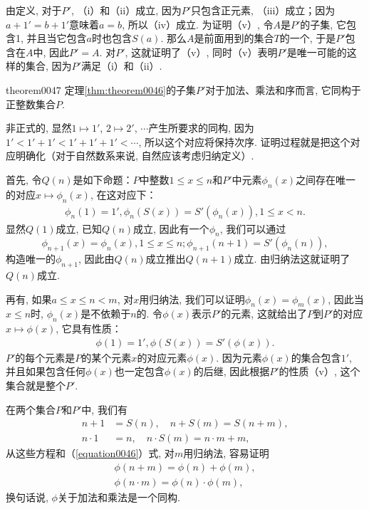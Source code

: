 由定义, 对于$P'$, （i）和（ii）成立, 因为$P'$只包含正元素, （iii）成立；因为$a+1'=b+1'$意味着$a=b$, 所以（iv）成立. 为证明（v）, 令$A$是$P'$的子集, 它包含1, 并且当它包含$a$时也包含$S(a)$. 那么$A$是前面用到的集合$T$的一个, 于是$P'$包含在$A$中, 因此$P'=A$. 对$P'$, 这就证明了（v）, 同时（v）表明$P'$是唯一可能的这样的集合, 因为$P'$满足（i）和（ii）. 

\begin{theorem}{}{theorem0047}
定理\ref{thm:theorem0046}的子集$P'$对于加法、乘法和序而言, 它同构于正整数集合$P$. 
\end{theorem}

非正式的, 显然$1 \mapsto 1'$, $2 \mapsto 2'$, $\cdots$产生所要求的同构, 因为$1' < 1'+1' < 1'+1'+1' < \cdots$, 所以这个对应将保持次序. 证明过程就是把这个对应明确化（对于自然数系来说, 自然应该考虑归纳定义）. 

首先, 令$Q(n)$是如下命题：$P$中整数$1 \le x \le n$和$P'$中元素$\phi_n(x)$之间存在唯一的对应$x \mapsto \phi_n(x)$, 在这对应下：
\begin{gather}\label{equation0045}
\phi_n(1) = 1',\phi_n(S(x)) = S'(\phi_n(x)), 1 \le x < n.
\end{gather}
显然$Q(1)$成立, 已知$Q(n)$成立, 因此有一个$\phi_n$, 我们可以通过
\[
\phi_{n+1}(x)=\phi_n(x), 1 \le x \le n; \phi_{n+1}(n+1) = S'(\phi_n(n)),
\]
构造唯一的$\phi_{n+1}$, 因此由$Q(n)$成立推出$Q(n+1)$成立. 由归纳法这就证明了$Q(n)$成立. 

再有, 如果$a \le x \le n < m$, 对$x$用归纳法, 我们可以证明$\phi_n(x) = \phi_m(x)$, 因此当$x \le n$时, $\phi_n(x)$是不依赖于$n$的. 令$\phi(x)$表示$P'$的元素, 这就给出了$P$到$P'$的对应$x \mapsto \phi(x)$, 它具有性质：
\begin{gather}\label{equation0046}
\phi(1)=1',\phi(S(x)) = S'(\phi(x)).
\end{gather}
$P'$的每个元素是$P$的某个元素$x$的对应元素$\phi(x)$. 因为元素$\phi(x)$的集合包含$1'$, 并且如果包含任何$\phi(x)$也一定包含$\phi(x)$的后继, 因此根据$P'$的性质（v）, 这个集合就是整个$P'$. 

在两个集合$P$和$P'$中, 我们有
\begin{align}
n+1&=S(n), \quad n+S(m) = S(n+m), \label{equation0047}\\
n \cdot 1 &= n,\quad n \cdot S(m) = n \cdot m + m,\label{equation0048}
\end{align}
从这些方程和（\ref{equation0046}）式, 对$m$用归纳法, 容易证明
\[
\begin{aligned}
\phi(n+m)=\phi(n)+\phi(m),\\
\phi(n \cdot m) = \phi(n)\cdot\phi(m),
\end{aligned}
\]
换句话说, $\phi$关于加法和乘法是一个同构. 

